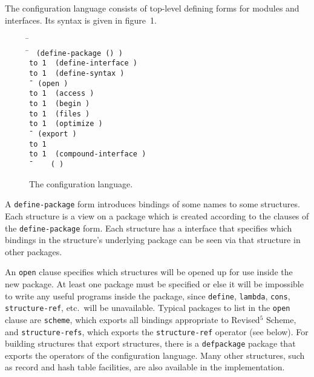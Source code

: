 The configuration language consists of top-level defining forms for
modules and interfaces.  Its syntax is given in figure~1.

\hbox{\goesto}
\newcommand{\altz}{\hbox to 1\wd0{\hfil\alt}}


\begin{figure}
\begin{tabbing}
    \=\goesto{}~ \\
    \=\goesto{}~
      \tt(define-package ()
          ) \\
	\>\altz{}~ \tt(define-interface  ) \\
	\>\altz{}~ \tt(define-syntax  ) \\
    \=\goesto{}~ \tt(open ) \\
	\>\altz{}~ \tt(access ) \\
	\>\altz{}~ \tt(begin ) \\
	\>\altz{}~ \tt(files ) \\
	\>\altz{}~ \tt(optimize ) \\
    \=\goesto{}~ \tt(export ) \\
	\>\altz{}~  \\
	\>\altz{}~ \tt(compound-interface ) \\
    \=\goesto{}~  ~\alt{}~ \tt( )
\end{tabbing}
\caption{The configuration language.}
\end{figure}


A {\tt define-package} form introduces bindings of some names to some
structures.  Each structure is a view on a package which is created
according to the clauses of the {\tt define-package} form.  Each
structure has a interface that specifies which bindings in the
structure's underlying package can be seen via that structure in other
packages.

An {\tt open} clause specifies which structures will be opened up for
use inside the new package.  At least one package must be specified or
else it will be impossible to write any useful programs inside the
package, since {\tt define}, {\tt lambda}, {\tt cons}, {\tt
structure-ref}, etc.\ will be unavailable.  Typical packages to list
in the {\tt open} clause are {\tt scheme}, which exports all bindings
appropriate to Revised$^5$ Scheme, and {\tt structure-refs}, which
exports the {\tt structure-ref} operator (see below).  For building
structures that export structures, there is a {\tt defpackage} package
that exports the operators of the configuration language.  Many other
structures, such as record and hash table facilities, are also
available in the \hack{} implementation.

